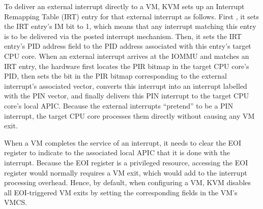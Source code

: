 To deliver an external interrupt directly to a VM, KVM sets up an Interrupt Remapping Table (IRT) entry for that external interrupt as follows.
First , it sets the IRT entry's IM bit to 1, which means that any interrupt matching this entry is to be delivered via the posted interrupt mechanism.  
Then, it sets the IRT entry's PID address field to the PID address associated with this entry's target CPU core. 
When an external interrupt arrives at the IOMMU and matches an IRT entry, the 
hardware first locates the PIR bitmap in the target CPU core's PID, then sets the bit in the PIR bitmap corresponding to the external interrupt's associated vector,
converts this interrupt into an interrupt labelled with the PIN vector, and finally delivers this PIN interrupt to the target CPU core's local APIC.
Because the external interrupts ``pretend'' to be a PIN interrupt, the target CPU core processes them directly without causing any VM exit.

When a VM completes the service of an interrupt, it needs to clear the EOI register to indicate to the 
associated local APIC that it is done with the interrupt. Because the EOI register is a privileged resource, accessing the EOI register
would normally requires a VM exit, which would add to the interrupt processing overhead. 
Hence, by default, when configuring a VM, KVM disables all EOI-triggered VM exits by setting the corresponding fields in the VM's VMCS.

